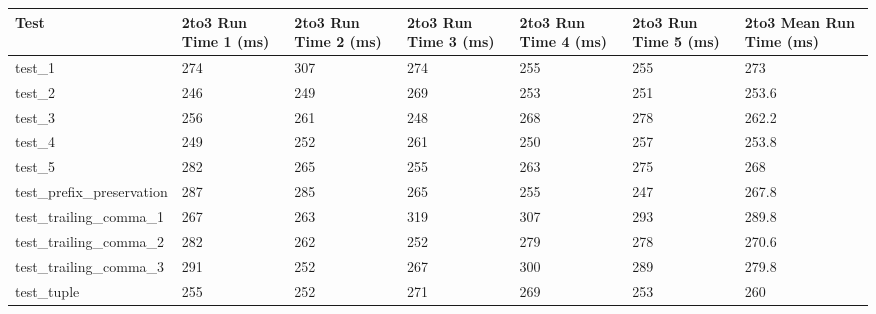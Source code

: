 \begin{table}[h!]
    \centering
    \begin{tabular}{@{}l|p{5em}p{5em}p{5em}p{5em}p{5em}p{5em}@{}}
    \toprule
    Test                                  & 2to3 Run Time 1 (ms) & 2to3 Run Time 2 (ms) & 2to3 Run Time 3 (ms) & 2to3 Run Time 4 (ms) & 2to3 Run Time 5 (ms) & 2to3 Mean Run Time (ms) \\ \midrule
    test\_1                               & 274                  & 307                  & 274                  & 255                  & 255                  & 273                        \\
    test\_2                               & 246                  & 249                  & 269                  & 253                  & 251                  & 253.6                      \\
    test\_3                               & 256                  & 261                  & 248                  & 268                  & 278                  & 262.2                      \\ 
    test\_4                               & 249                  & 252                  & 261                  & 250                  & 257                  & 253.8                      \\
    test\_5                               & 282                  & 265                  & 255                  & 263                  & 275                  & 268                        \\
    test\_prefix\_preservation            & 287                  & 285                  & 265                  & 255                  & 247                  & 267.8                      \\
    test\_trailing\_comma\_1              & 267                  & 263                  & 319                  & 307                  & 293                  & 289.8                      \\
    test\_trailing\_comma\_2              & 282                  & 262                  & 252                  & 279                  & 278                  & 270.6                      \\
    test\_trailing\_comma\_3              & 291                  & 252                  & 267                  & 300                  & 289                  & 279.8                      \\
    test\_tuple                           & 255                  & 252                  & 271                  & 269                  & 253                  & 260                        \\

\end{tabular}
\end{table}
